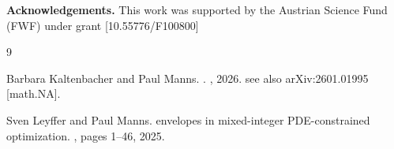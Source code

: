 \documentclass[11pt]{article}
\begin{document}
\noindent
\textbf{Acknowledgements.}
This work was supported by the Austrian Science Fund (FWF) under grant
[10.55776/F100800]

\vspace{1em}

\begin{thebibliography}{9}

Barbara Kaltenbacher and Paul Manns.
.
, 2026.
\newblock see also arXiv:2601.01995 [math.NA].

Sven Leyffer and Paul Manns.
 envelopes in mixed-integer {PDE}-constrained
  optimization.
, pages 1--46, 2025.

\end{thebibliography}
\end{document}
